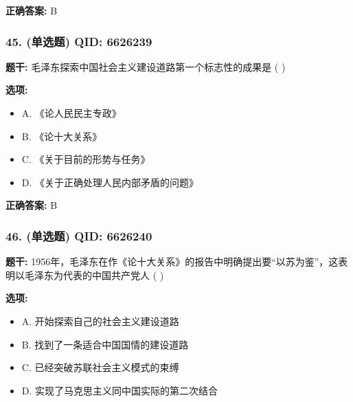 \documentclass[12pt,UTF8]{ctexart}
\begin{document}
\textbf{正确答案:}
B

\vspace{0.3em}\hrulefill\vspace{0.7em}

\subsubsection*{45. (单选题) \small QID: 6626239}

\textbf{题干:}
毛泽东探索中国社会主义建设道路第一个标志性的成果是  ( )

\textbf{选项:}
\begin{itemize}[leftmargin=*]

  \item A. 《论人民民主专政》

  \item B. 《论十大关系》

  \item C. 《关于目前的形势与任务》

  \item D. 《关于正确处理人民内部矛盾的问题》

\end{itemize}

\textbf{正确答案:}
B

\vspace{0.3em}\hrulefill\vspace{0.7em}

\subsubsection*{46. (单选题) \small QID: 6626240}

\textbf{题干:}
1956年，毛泽东在作《论十大关系》的报告中明确提出要“以苏为鉴”，这表明以毛泽东为代表的中国共产党人  ( )

\textbf{选项:}
\begin{itemize}[leftmargin=*]

  \item A. 开始探索自己的社会主义建设道路

  \item B. 找到了一条适合中国国情的建设道路

  \item C. 已经突破苏联社会主义模式的束缚

  \item D. 实现了马克思主义同中国实际的第二次结合

\end{itemize}
\end{document}
